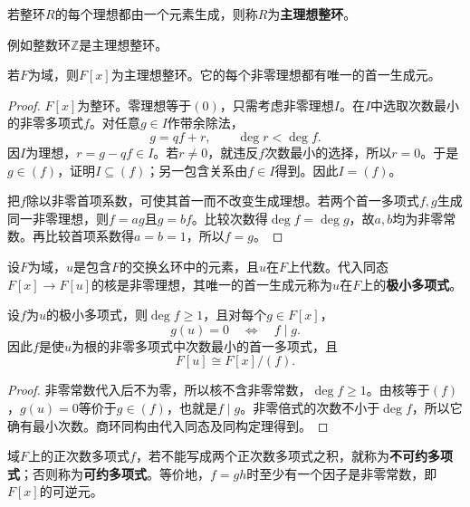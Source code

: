 \begin{definition}
若整环$R$的每个理想都由一个元素生成，则称$R$为\textbf{主理想整环}。
\end{definition}
例如整数环$\mathbb Z$是主理想整环。
\begin{theorem}\label{p2:field-poly-pid}
若$F$为域，则$F[x]$为主理想整环。它的每个非零理想都有唯一的首一生成元。
\end{theorem}
\begin{proof}
$F[x]$为整环。零理想等于$(0)$，只需考虑非零理想$I$。在$I$中选取次数最小的非零多项式$f$。对任意$g\in I$作带余除法，
\[
g=qf+r,\qquad\deg r<\deg f.
\]
因$I$为理想，$r=g-qf\in I$。若$r\ne0$，就违反$f$次数最小的选择，所以$r=0$。于是$g\in(f)$，证明$I\subseteq(f)$；另一包含关系由$f\in I$得到。因此$I=(f)$。

把$f$除以非零首项系数，可使其首一而不改变生成理想。若两个首一多项式$f,g$生成同一非零理想，则$f=ag$且$g=bf$。比较次数得$\deg f=\deg g$，故$a,b$均为非零常数。再比较首项系数得$a=b=1$，所以$f=g$。
\end{proof}

\begin{definition}
设$F$为域，$u$是包含$F$的交换幺环中的元素，且$u$在$F$上代数。代入同态$F[x]\to F[u]$的核是非零理想，其唯一的首一生成元称为$u$在$F$上的\textbf{极小多项式}。
\end{definition}

\begin{proposition}
设$f$为$u$的极小多项式，则$\deg f\ge1$，且对每个$g\in F[x]$，
\[
g(u)=0\quad\Longleftrightarrow\quad f\mid g.
\]
因此$f$是使$u$为根的非零多项式中次数最小的首一多项式，且
\[
F[u]\cong F[x]/(f).
\]
\end{proposition}
\begin{proof}
非零常数代入后不为零，所以核不含非零常数，$\deg f\ge1$。由核等于$(f)$，$g(u)=0$等价于$g\in(f)$，也就是$f\mid g$。非零倍式的次数不小于$\deg f$，所以它确有最小次数。商环同构由代入同态及同构定理得到。
\end{proof}

\begin{definition}
域$F$上的正次数多项式$f$，若不能写成两个正次数多项式之积，就称为\textbf{不可约多项式}；否则称为\textbf{可约多项式}。等价地，$f=gh$时至少有一个因子是非零常数，即$F[x]$的可逆元。
\end{definition}


